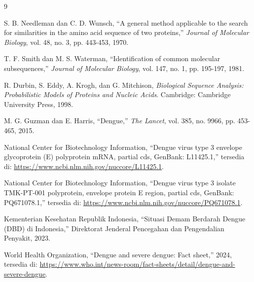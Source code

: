 \documentclass[conference]{IEEEtran}
\begin{document}
\begin{thebibliography}{9}

S. B. Needleman dan C. D. Wunsch, ``A general method applicable to the search for similarities in the amino acid sequence of two proteins,'' \textit{Journal of Molecular Biology}, vol. 48, no. 3, pp. 443-453, 1970.

T. F. Smith dan M. S. Waterman, ``Identification of common molecular subsequences,'' \textit{Journal of Molecular Biology}, vol. 147, no. 1, pp. 195-197, 1981.

R. Durbin, S. Eddy, A. Krogh, dan G. Mitchison, \textit{Biological Sequence Analysis: Probabilistic Models of Proteins and Nucleic Acids}. Cambridge: Cambridge University Press, 1998.

M. G. Guzman dan E. Harris, ``Dengue,'' \textit{The Lancet}, vol. 385, no. 9966, pp. 453-465, 2015.

National Center for Biotechnology Information, ``Dengue virus type 3 envelope glycoprotein (E) polyprotein mRNA, partial cds, GenBank: L11425.1,'' tersedia di: \url{https://www.ncbi.nlm.nih.gov/nuccore/L11425.1}.

National Center for Biotechnology Information, ``Dengue virus type 3 isolate TMK-PT-001 polyprotein, envelope protein E region, partial cds, GenBank: PQ671078.1,'' tersedia di: \url{https://www.ncbi.nlm.nih.gov/nuccore/PQ671078.1}.

Kementerian Kesehatan Republik Indonesia, ``Situasi Demam Berdarah Dengue (DBD) di Indonesia,'' Direktorat Jenderal Pencegahan dan Pengendalian Penyakit, 2023.

World Health Organization, ``Dengue and severe dengue: Fact sheet,'' 2024, tersedia di: \url{https://www.who.int/news-room/fact-sheets/detail/dengue-and-severe-dengue}.

\end{thebibliography}
\end{document}
